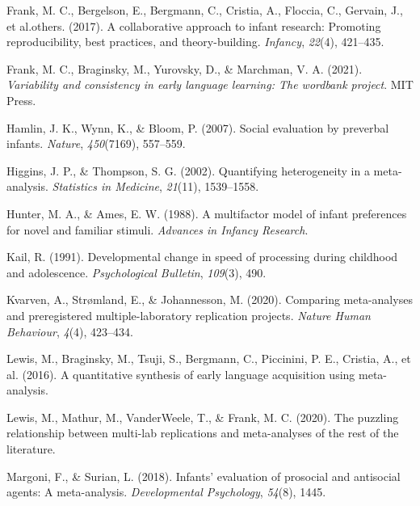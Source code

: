 \documentclass[10pt, letterpaper]{article}
\newenvironment{CSLReferences}%
  {}%
  {\par}
\begin{document}
\begin{CSLReferences}{1}{0}
\leavevmode{}%
Frank, M. C., Bergelson, E., Bergmann, C., Cristia, A., Floccia, C.,
Gervain, J., et al.others. (2017). A collaborative approach to infant
research: Promoting reproducibility, best practices, and
theory-building. \emph{Infancy}, \emph{22}(4), 421--435.

\leavevmode{}%
Frank, M. C., Braginsky, M., Yurovsky, D., \& Marchman, V. A. (2021).
\emph{Variability and consistency in early language learning: The
wordbank project}. MIT Press.

\leavevmode{}%
Hamlin, J. K., Wynn, K., \& Bloom, P. (2007). Social evaluation by
preverbal infants. \emph{Nature}, \emph{450}(7169), 557--559.

\leavevmode{}%
Higgins, J. P., \& Thompson, S. G. (2002). Quantifying heterogeneity in
a meta-analysis. \emph{Statistics in Medicine}, \emph{21}(11),
1539--1558.

\leavevmode{}%
Hunter, M. A., \& Ames, E. W. (1988). A multifactor model of infant
preferences for novel and familiar stimuli. \emph{Advances in Infancy
Research}.

\leavevmode{}%
Kail, R. (1991). Developmental change in speed of processing during
childhood and adolescence. \emph{Psychological Bulletin}, \emph{109}(3),
490.

\leavevmode{}%
Kvarven, A., Strømland, E., \& Johannesson, M. (2020). Comparing
meta-analyses and preregistered multiple-laboratory replication
projects. \emph{Nature Human Behaviour}, \emph{4}(4), 423--434.

\leavevmode{}%
Lewis, M., Braginsky, M., Tsuji, S., Bergmann, C., Piccinini, P. E.,
Cristia, A., et al. (2016). A quantitative synthesis of early language
acquisition using meta-analysis.

\leavevmode{}%
Lewis, M., Mathur, M., VanderWeele, T., \& Frank, M. C. (2020). The
puzzling relationship between multi-lab replications and meta-analyses
of the rest of the literature.

\leavevmode{}%
Margoni, F., \& Surian, L. (2018). Infants' evaluation of prosocial and
antisocial agents: A meta-analysis. \emph{Developmental Psychology},
\emph{54}(8), 1445.


\end{CSLReferences}
\end{document}
